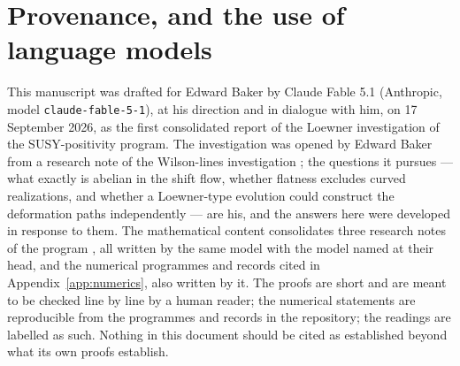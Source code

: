 \section{Provenance, and the use of language models}\label{app:provenance}

This manuscript was drafted for Edward Baker by Claude Fable 5.1 (Anthropic,
model \texttt{claude-fable-5-1}), at his direction and in dialogue with him,
on 17 September 2026, as the first consolidated report of the Loewner
investigation of the SUSY-positivity program. The investigation was opened by
Edward Baker from a research note of the Wilson-lines investigation
\cite{LoewnerNote}; the questions it pursues --- what exactly is abelian in
the shift flow, whether flatness excludes curved realizations, and whether a
Loewner-type evolution could construct the deformation paths independently
--- are his, and the answers here were developed in response to them. The
mathematical content consolidates three research notes of the program
\cite{LoewnerNote,OpeningNote,ContractionNote}, all written by the same model
with the model named at their head, and the numerical programmes and records
cited in Appendix~\ref{app:numerics}, also written by it. The proofs are
short and are meant to be checked line by line by a human reader; the
numerical statements are reproducible from the programmes and records in the
repository; the readings are labelled as such. Nothing in this document should
be cited as established beyond what its own proofs establish.
